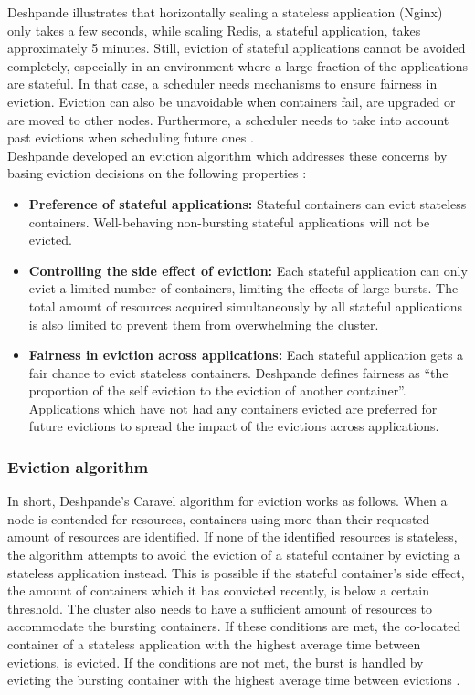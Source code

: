 Deshpande illustrates that horizontally scaling a stateless application (Nginx) only takes a few seconds, while scaling Redis, a stateful application, takes approximately 5 minutes. Still, eviction of stateful applications cannot be avoided completely, especially in an environment where a large fraction of the applications are stateful. In that case, a scheduler needs mechanisms to ensure fairness in eviction. Eviction can also be unavoidable when containers fail, are upgraded or are moved to other nodes. Furthermore, a scheduler needs to take into account past evictions when scheduling future ones \citep{caravel}.\\

Deshpande developed an eviction algorithm which addresses these concerns by basing eviction decisions on the following properties \citep{caravel}:
\begin{itemize}
\item \textbf{Preference of stateful applications:} Stateful containers can evict stateless containers. Well-behaving non-bursting stateful applications will not be evicted. \newpage
\item \textbf{Controlling the side effect of eviction:} Each stateful application can only evict a limited number of containers, limiting the effects of large bursts. The total amount of resources acquired simultaneously by all stateful applications is also limited to prevent them from overwhelming the cluster.
\item \textbf{Fairness in eviction across applications:} Each stateful application gets a fair chance to evict stateless containers. Deshpande defines fairness as ``the proportion of the self eviction to the eviction of another container''. Applications which have not had any containers evicted are preferred for future evictions to spread the impact of the evictions across applications.
\end{itemize}

\subsubsection{Eviction algorithm}
In short, Deshpande's Caravel algorithm for eviction works as follows. When a node is contended for resources, containers using more than their requested amount of resources are identified. If none of the identified resources is stateless, the algorithm attempts to avoid the eviction of a stateful container by evicting a stateless application instead. This is possible if the stateful container's side effect, the amount of containers which it has convicted recently, is below a certain threshold. The cluster also needs to have a sufficient amount of resources to accommodate the bursting containers. If these conditions are met, the co-located container of a stateless application with the highest average time between evictions, is evicted. If the conditions are not met, the burst is handled by evicting the bursting container with the highest average time between evictions \citep{caravel}.

